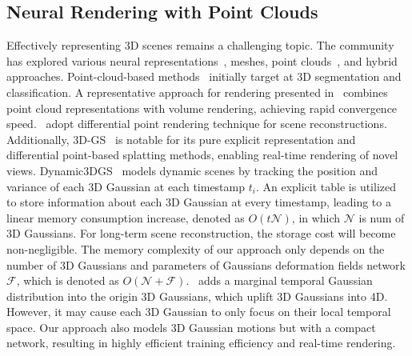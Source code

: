 \subsection{Neural Rendering with Point Clouds}\label{subsec:neural rendering with point clouds}
Effectively representing 3D scenes remains a challenging topic. The community has explored various neural representations~\cite{mildenhall2021nerf}, \eg meshes, point clouds~\cite{pointnerf}, and hybrid approaches. Point-cloud-based methods~\cite{qi2017pointnet,qi2017pointnet++,yu2018pu,liu2019meteornet} initially target at 3D segmentation and classification. A representative approach for rendering presented in~\cite{pointnerf, abou2022particlenerf} combines point cloud representations with volume rendering, achieving rapid convergence speed.~\cite{keselman2023flexibleTechniquesDifferentiableRendering,keselman2022approximatedifferentiablerenderingwithalgebraicsurfaces,ruckert2022adop} adopt differential point rendering technique for scene reconstructions. Additionally, 3D-GS~\cite{3dgs} is notable for its pure explicit representation and differential point-based splatting methods, enabling real-time rendering of novel views. Dynamic3DGS~\cite{dynamic3dgs} models dynamic scenes by tracking the position and variance of each 3D Gaussian at each timestamp $t_i$. An explicit table is utilized to store information about each 3D Gaussian at every timestamp, leading to a linear memory consumption increase, denoted as $O(t\mathcal{N})$, in which $\mathcal{N}$ is num of 3D Gaussians. For long-term scene reconstruction, the storage cost will become non-negligible. The memory complexity of our approach only depends on the number of 3D Gaussians and parameters of Gaussians deformation fields network $\mathcal{F}$, which is denoted as $O(\mathcal{N}+\mathcal{F})$.~\cite{4dgs-2} adds a marginal temporal Gaussian distribution into the origin 3D Gaussians, which uplift 3D Gaussians into 4D. However, it may cause each 3D Gaussian to only focus on their local temporal space. Our approach also models 3D Gaussian motions but with a compact  network, resulting in highly efficient training efficiency and real-time rendering.  
